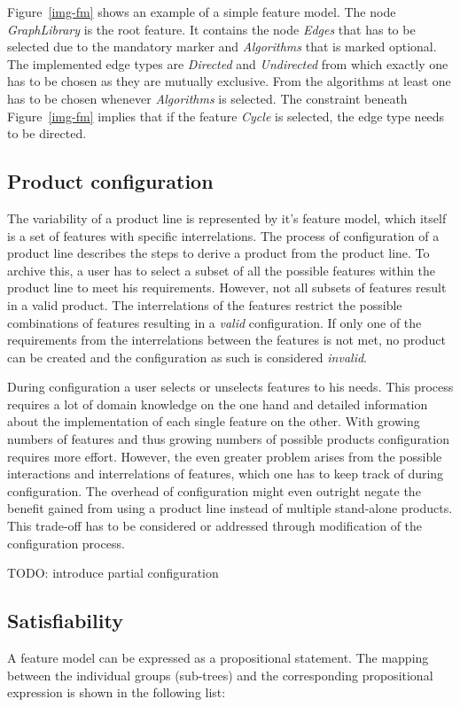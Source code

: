 Figure~\ref{img-fm} shows an example of a simple feature model. The node \textit{GraphLibrary} is the root feature. It contains the node \textit{Edges} that has to be selected due to the mandatory marker and \textit{Algorithms} that is marked optional. The implemented edge types are \textit{Directed} and \textit{Undirected} from which exactly one has to be chosen as they are mutually exclusive. From the algorithms at least one has to be chosen whenever \textit{Algorithms} is selected. The constraint beneath Figure~\ref{img-fm} implies that if the feature \textit{Cycle} is selected, the edge type needs to be directed.

\subsection{Product configuration}
The variability of a product line is represented by it's feature model, which itself is a set of features with specific interrelations. The process of configuration of a product line describes the steps to derive a product from the product line. To archive this, a user has to select a subset of all the possible features within the product line to meet his requirements. However, not all subsets of features result in a valid product. The interrelations of the features restrict the possible combinations of features resulting in a \textit{valid} configuration. If only one of the requirements from the interrelations between the features is not met, no product can be created and the configuration as such is considered \textit{invalid}.

During configuration a user selects or unselects features to his needs. This process requires a lot of domain knowledge on the one hand and detailed information about the implementation of each single feature on the other. With growing numbers of features and thus growing numbers of possible products configuration requires more effort. However, the even greater problem arises from the possible interactions and interrelations of features, which one has to keep track of during configuration. The overhead of configuration might even outright negate the benefit gained from using a product line instead of multiple stand-alone products. This trade-off has to be considered or addressed through modification of the configuration process.

{\color{red}TODO: introduce partial configuration}

\subsection{Satisfiability}
A feature model can be expressed as a propositional statement. The mapping between the individual groups (sub-trees) and the corresponding propositional expression is shown in the following list:

